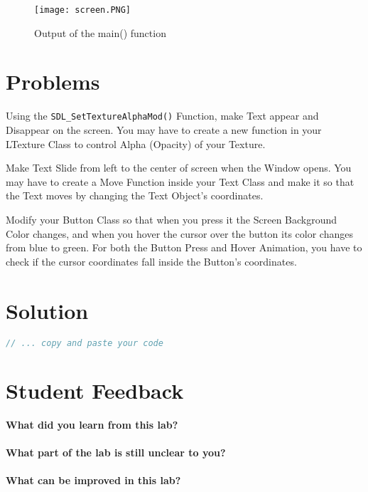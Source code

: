 \documentclass[11pt,fleqn]{book} %
\begin{document}
\begin{figure}[h]
  \centering
  \texttt{[image: screen.PNG]}
  \caption{Output of the main() function}
\end{figure}

\newpage
\section{Problems}

\begin{problem} Using the \texttt{SDL\_SetTextureAlphaMod()} Function, make Text appear and Disappear on the screen. You may have to create a new function in your LTexture Class to control Alpha (Opacity) of your Texture.\\
\end{problem}
\begin{problem} Make Text Slide from left to the center of screen when the Window opens. You may have to create a Move Function inside your Text Class and make it so that the Text moves by changing the Text Object's coordinates.\\
\end{problem}
\begin{problem} Modify your Button Class so that when you press it the Screen Background Color changes, and when you hover the cursor over the button its color changes from blue to green. For both the Button Press and Hover Animation, you have to check if the cursor coordinates fall inside the Button's coordinates.
\end{problem}

\newpage
\section{Solution}
\begin{lstlisting}[language=C++]
  // ... copy and paste your code
\end{lstlisting}

\newpage
\section{Student Feedback}
\textbf{What did you learn from this lab?}\\
\noindent\fbox{\parbox{\textwidth}{
  }
}\\
\textbf{What part of the lab is still unclear to you?}\\
\noindent\fbox{\parbox{\textwidth}{
  }
}\\
\textbf{What can be improved in this lab?}\\ 
\noindent\fbox{\parbox{\textwidth}{
  }
}\\
\end{document}

